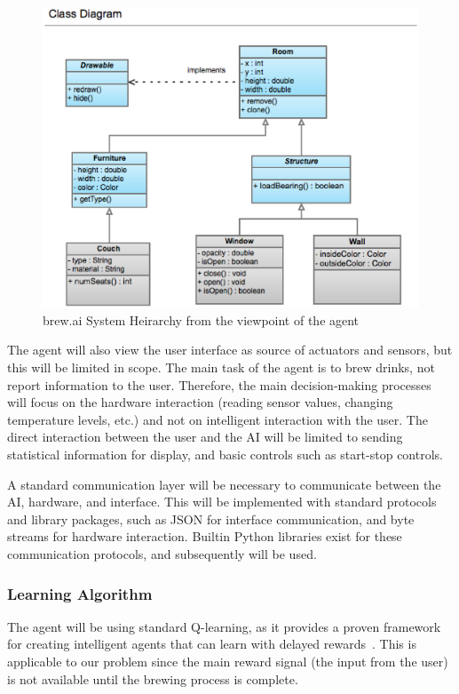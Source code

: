 \documentclass[draftclsnofoot,onecolumn,letterpaper,10pt]{IEEEtran}
\begin{document}
\begin{figure}\label{fig:AIsystemDesign}
\begin{center}
	\caption{brew.ai System Heirarchy from the viewpoint of the agent}
	\includegraphics[scale=0.3]{tmp.eps}
\end{center}
\end{figure}

The agent will also view the user interface as source of actuators and sensors, but this will be limited in scope.
The main task of the agent is to brew drinks, not report information to the user.
Therefore, the main decision-making processes will focus on the hardware interaction (reading sensor values, changing temperature levels, etc.) and not on intelligent interaction with the user.
The direct interaction between the user and the AI will be limited to sending statistical information for display, and basic controls such as start-stop controls.

A standard communication layer will be necessary to communicate between the AI, hardware, and interface.
This will be implemented with standard protocols and library packages, such as JSON for interface communication, and byte streams for hardware interaction.
Builtin Python libraries exist for these communication protocols, and subsequently will be used.

\subsubsection{Learning Algorithm} 
The agent will be using standard Q-learning, as it provides a proven framework for creating intelligent agents that can learn with delayed rewards~\cite{SuttonBarto}.
This is applicable to our problem since the main reward signal (the input from the user) is not available until the brewing process is complete.
\end{document}
